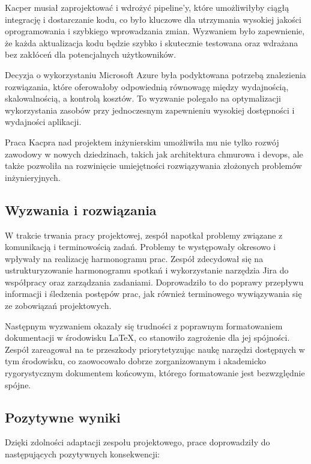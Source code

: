 \documentclass[12pt, a4paper, twoside, openany]{book}
\newcommand{\forceindent}{\leavevmode{\parindent=1.3em\indent}}
\begin{document}
{Kacper musiał zaprojektować i wdrożyć pipeline'y, które umożliwiłyby ciągłą integrację i dostarczanie kodu, co było kluczowe dla utrzymania wysokiej jakości oprogramowania i szybkiego wprowadzania zmian. Wyzwaniem było zapewnienie, że każda aktualizacja kodu będzie szybko i skutecznie testowana oraz wdrażana bez zakłóceń dla potencjalnych użytkowników.

Decyzja o wykorzystaniu Microsoft Azure była podyktowana potrzebą znalezienia rozwiązania, które oferowałoby odpowiednią równowagę między wydajnością, skalowalnością, a kontrolą kosztów. To wyzwanie polegało na optymalizacji wykorzystania zasobów przy jednoczesnym zapewnieniu wysokiej dostępności i wydajności aplikacji.

Praca Kacpra nad projektem inżynierskim umożliwiła mu nie tylko rozwój zawodowy w nowych dziedzinach, takich jak architektura chmurowa i devops, ale także pozwoliła na rozwinięcie umiejętności rozwiązywania złożonych problemów inżynieryjnych.

\subsection{Wyzwania i rozwiązania}

\forceindent W trakcie trwania pracy projektowej, zespół napotkał problemy związane z komunikacją i terminowością zadań. Problemy te występowały okresowo i wpływały na realizację harmonogramu prac. Zespół zdecydował się na ustrukturyzowanie harmonogramu spotkań i wykorzystanie narzędzia Jira do współpracy oraz zarządzania zadaniami. Doprowadziło to do poprawy przepływu informacji i śledzenia postępów prac, jak również terminowego wywiązywania się ze zobowiązań projektowych.

Następnym wyzwaniem okazały się trudności z poprawnym formatowaniem dokumentacji w środowisku LaTeX, co stanowiło zagrożenie dla jej spójności. Zespół zareagował na te przeszkody priorytetyzując naukę narzędzi dostępnych w tym środowisku, co zaowocowało dobrze zorganizowanym i akademicko rygorystycznym dokumentem końcowym, którego formatowanie jest bezwzględnie spójne.

\subsection{Pozytywne wyniki}

\forceindent Dzięki zdolności adaptacji zespołu projektowego, prace doprowadziły do następujących pozytywnych konsekwencji:

}
\end{document}
